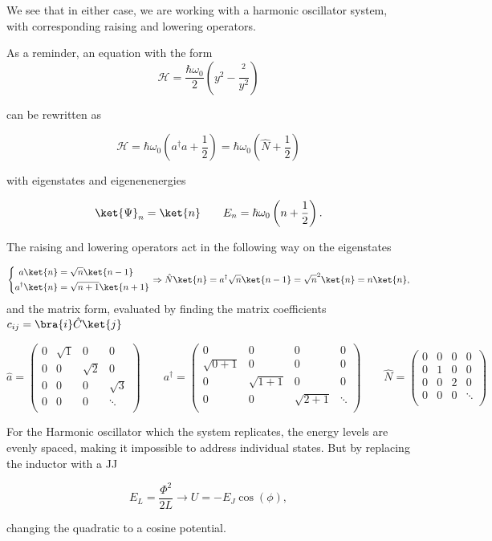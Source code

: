    We see that in either case, we are working with a harmonic oscillator system, with corresponding raising and lowering
   operators.

   {\scriptsize As a reminder, an equation with the form
     \[
       \mathcal{H} = \frac{\hbar\omega_0}{2}\left(y^2-\frac{^2}{y^2}\right)
     \]

     \noindent can be rewritten as

    \[
      \mathcal{H} = \hbar\omega_0\left(a^{\dagger}a+\frac{1}{2}\right)= \hbar\omega_0\left(\hat{N}+\frac{1}{2}\right)
    \]

    with eigenstates and eigenenenergies

    \[
      \ket{\Psi}_n=\ket{n} \qquad E_n= \hbar\omega_0\left(n+\frac{1}{2}\right).
    \]

    \noindent The raising and lowering operators act in the following way on the eigenstates

    \[
      \left\lbrace\begin{aligned}
          a\ket{n} & = \sqrt{n}\ket{n-1}\\
          a^{\dagger}\ket{n} &= \sqrt{n+1}\ket{n+1}\\
        \end{aligned}\right. \Rightarrow
      \hat{N}\ket{n} = a^{\dagger} \sqrt{n}\ket{n-1} = \sqrt{n}^2\ket{n}=n\ket{n} ,
    \]
    \noindent and the matrix form, evaluated by finding the matrix coefficients $ c_{ij}=\bra{i}\hat{C}\ket{j} $

    \[
      \hat{a}=\begin{pmatrix}
        0 & \sqrt{1} & 0 & 0\\
        0 & 0 & \sqrt{2} & 0\\
        0 & 0 & 0 & \sqrt{3}\\
        0 & 0 & 0 & \ddots\\
      \end{pmatrix} \qquad a^{\dagger}=\begin{pmatrix}
        0 & 0 & 0 & 0\\
        \sqrt{0+1} & 0 & 0 & 0\\
        0 & \sqrt{1+1} & 0 & 0\\
        0 & 0 & \sqrt{2+1} & \ddots\\
      \end{pmatrix} \qquad \hat{N} =\begin{pmatrix}
        0 & 0 & 0 & 0\\
        0 & 1 & 0 & 0\\
        0 & 0 & 2 & 0\\
        0 & 0 & 0 & \ddots\\
      \end{pmatrix}
    \]
  }

  For the Harmonic oscillator which the system replicates, the  energy levels are evenly spaced, making it impossible to
  address individual states.  But by replacing the inductor with a JJ

   \begin{equation}
     E_L = \frac{\Phi^2}{2L} \longrightarrow U = -E_J\cos(\phi),
   \end{equation}

   \noindent changing the quadratic to a cosine potential.
   \newpage
